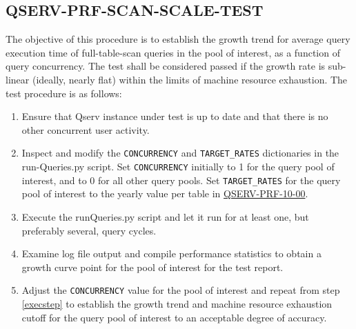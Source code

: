 \subsection{QSERV-PRF-SCAN-SCALE-TEST}
\label{qserv-prf-scan-scale-test}

The objective of this procedure is to establish the growth trend for average query execution time of
full-table-scan queries in the pool of interest, as a function of query concurrency.  The test shall
be considered passed if the growth rate is sub-linear (ideally, nearly flat) within the limits of
machine resource exhaustion.  The test procedure is as follows:

\begin{enumerate}

  \item{Ensure that Qserv instance under test is up to date and that there is no other concurrent
  user activity.}

  \item{Inspect and modify the \texttt{CONCURRENCY} and \texttt{TARGET\_RATES} dictionaries in the
  run-Queries.py script. Set \texttt{CONCURRENCY} initially to 1 for the query pool of interest, and to 0
  for all other query pools.  Set \texttt{TARGET\_RATES} for the query pool of interest to the yearly value
  per table in \hyperref[qserv-prf-10-00]{\textsc{QSERV-PRF-10-00}}}.

  \item{\label{execstep}Execute the runQueries.py script and let it run for at least one, but preferably
  several, query cycles.}

  \item{Examine log file output and compile performance statistics to obtain a growth curve point
  for the pool of interest for the test report.}

  \item{Adjust the \texttt{CONCURRENCY} value for the pool of interest and repeat from step \ref{execstep}
  to establish the growth trend and machine resource exhaustion cutoff for the query pool of interest to an
  acceptable degree of accuracy.}

\end{enumerate}
